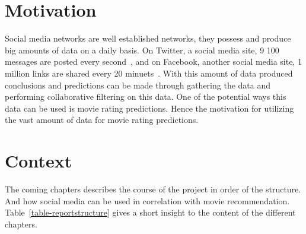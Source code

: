 \section{Motivation}
Social media networks are well established networks, they possess and produce big amounts of data on a daily basis. On Twitter, a social media site, 9 100 messages are posted every second~\cite{twitt-stats}, and on Facebook, another social media site, 1 million links are shared every 20 minuets~\cite{face-stats}. With this amount of data produced conclusions and predictions can be made through gathering the data and performing collaborative filtering on this data. One of the potential ways this data can be used is movie rating predictions. Hence the motivation for utilizing the vast amount of data for movie rating predictions.


\section{Context}
The coming chapters describes the course of the project in order of the structure. And how social media can be used in correlation with movie recommendation. Table~\ref{table-reportstructure} gives a short insight to the content of the different chapters.

